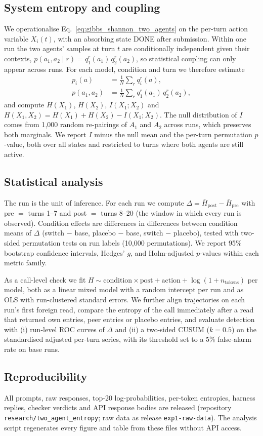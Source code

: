 \subsection{System entropy and coupling}
We operationalise Eq.~\ref{eq:gibbs_shannon_two_agents} on the per-turn action variable $X_i(t)$, with an absorbing state DONE after submission. Within one run the two agents' samples at turn $t$ are conditionally independent given their contexts, $p(a_1, a_2 \mid r) = q^r_1(a_1)\, q^r_2(a_2)$, so statistical coupling can only appear across runs. For each model, condition and turn we therefore estimate
\begin{align}
p_i(a) &= \frac{1}{N} \sum_r q^r_i(a), \\
p(a_1, a_2) &= \frac{1}{N} \sum_r q^r_1(a_1)\, q^r_2(a_2),
\end{align}
and compute $H(X_1)$, $H(X_2)$, $I(X_1; X_2)$ and $H(X_1, X_2) = H(X_1) + H(X_2) - I(X_1; X_2)$. The null distribution of $I$ comes from 1{,}000 random re-pairings of $A_1$ and $A_2$ across runs, which preserves both marginals. We report $I$ minus the null mean and the per-turn permutation $p$-value, both over all states and restricted to turns where both agents are still active.

\subsection{Statistical analysis}
The run is the unit of inference. For each run we compute $\Delta = \bar H_{\text{post}} - \bar H_{\text{pre}}$ with pre $= $ turns 1--7 and post $= $ turns 8--20 (the window in which every run is observed). Condition effects are differences in differences between condition means of $\Delta$ (switch $-$ base, placebo $-$ base, switch $-$ placebo), tested with two-sided permutation tests on run labels (10{,}000 permutations). We report 95\% bootstrap confidence intervals, Hedges' $g$, and Holm-adjusted $p$-values within each metric family.

As a call-level check we fit $H \sim \text{condition} \times \text{post} + \text{action} + \log(1 + n_{\text{tokens}})$ per model, both as a linear mixed model with a random intercept per run and as OLS with run-clustered standard errors. We further align trajectories on each run's first foreign read, compare the entropy of the call immediately after a read that returned own entries, peer entries or placebo entries, and evaluate detection with (i) run-level ROC curves of $\Delta$ and (ii) a two-sided CUSUM ($k = 0.5$) on the standardised adjusted per-turn series, with its threshold set to a 5\% false-alarm rate on base runs.

\subsection{Reproducibility}
All prompts, raw responses, top-20 log-probabilities, per-token entropies, harness replies, checker verdicts and API response bodies are released (repository \texttt{research/two\_agent\_entropy}; raw data as release \texttt{exp1-raw-data}). The analysis script regenerates every figure and table from these files without API access.

